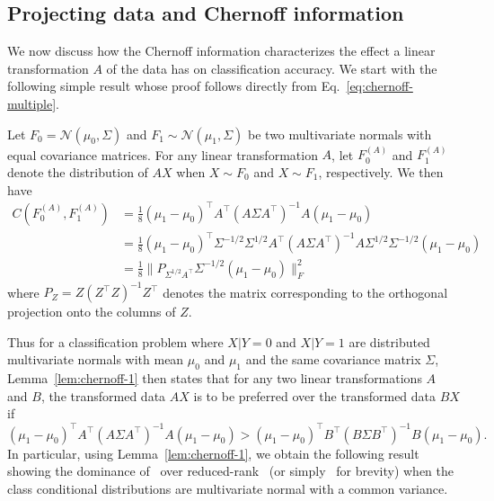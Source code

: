 \documentclass[11pt]{extarticle}
\begin{document}
\subsection{Projecting data and Chernoff information}
We now discuss how the Chernoff information characterizes the effect a linear transformation $A$ of the data has on classification accuracy.
We start with the following simple result whose proof follows directly from Eq.~\eqref{eq:chernoff-multiple}.
\begin{lem}
\label{lem:chernoff-1}
Let $F_0 = \mathcal{N}(\mu_0, \Sigma)$ and $F_1 \sim \mathcal{N}(\mu_1, \Sigma)$ be two multivariate normals with equal covariance matrices. For any linear transformation $A$, let $F_0^{(A)}$ and $F_1^{(A)}$ denote the distribution of $AX$ when $X \sim F_0$ and $X \sim F_1$, respectively. We then have
\begin{equation}
\begin{split}
C(F_0^{(A)}, F_1^{(A)}) &= \frac{1}{8} (\mu_1 - \mu_0)^{\top} A^{\top} (A \Sigma A^{\top})^{-1} A (\mu_1 - \mu_0) \\ & = \frac{1}{8} (\mu_1 - \mu_0)^{\top} \Sigma^{-1/2} \Sigma^{1/2} A^{\top} (A \Sigma A^{\top})^{-1} A \Sigma^{1/2} \Sigma^{-1/2} (\mu_1 - \mu_0) \\
&= \frac{1}{8} \|P_{\Sigma^{1/2} A^{\top}} \Sigma^{-1/2} (\mu_1 - \mu_0) \|_{F}^{2}
\end{split}
\end{equation}
where $P_{Z} = Z(Z^{\top} Z)^{-1} Z^{\top}$ denotes the matrix corresponding to the orthogonal projection onto the columns of $Z$.
\end{lem}

Thus for a classification problem where $X | Y = 0$ and $X | Y = 1$ are distributed multivariate normals with mean $\mu_0$ and $\mu_1$ and the same covariance matrix $\Sigma$, Lemma~\ref{lem:chernoff-1} then states that for any two linear transformations $A$ and $B$, the transformed data $AX$ is to be preferred over the transformed data $BX$ if
$$ (\mu_1 - \mu_0)^{\top} A^{\top} (A \Sigma A^{\top})^{-1} A (\mu_1 - \mu_0) > (\mu_1 - \mu_0)^{\top} B^{\top} (B \Sigma B^{\top})^{-1} B (\mu_1 - \mu_0). $$
In particular, using Lemma~\ref{lem:chernoff-1}, we obtain the following result showing the dominance of \Lol~over reduced-rank \Lda~(or simply \Lda~for brevity) when the class conditional distributions are multivariate normal with a common variance.
\end{document}
